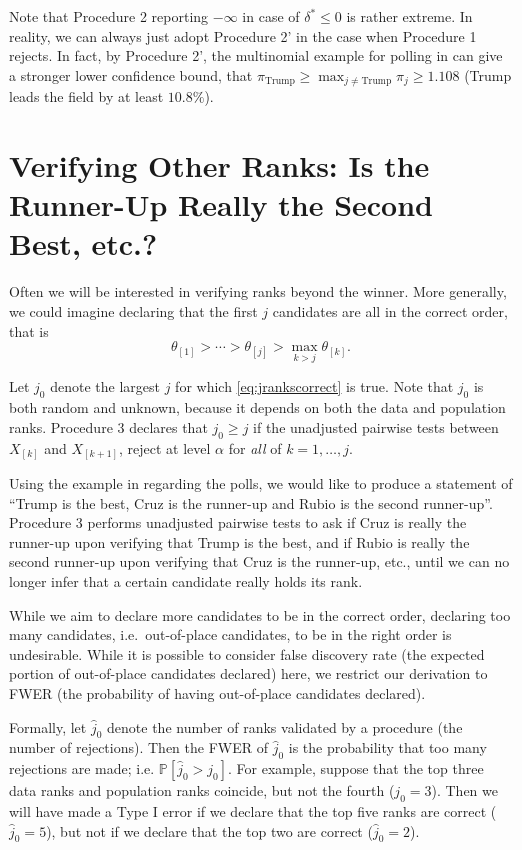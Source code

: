 \documentclass[11pt]{article}
\theoremstyle{definition}
\theoremstyle{custom}
\newcommand{\PP}{\mathbb{P}}
\begin{document}
Note that Procedure 2 reporting $-\infty$ in case of $\delta^* \le 0$ is rather extreme. In reality, we can always just adopt Procedure 2' in the case when Procedure 1 rejects. In fact, by Procedure 2', the multinomial example for polling in  can give a stronger lower confidence bound, that $\pi_{\text{Trump}} \ge \max_{j \ne \text{Trump}} \pi_{j} \ge 1.108$ (Trump leads the field by at least $10.8\%$).

\section{Verifying Other Ranks: Is the Runner-Up Really the Second Best, etc.?}
\label{sec:stepdown}

Often we will be interested in verifying ranks beyond the winner. More generally, we could imagine declaring that the first $j$ candidates are all in the correct order, that is
\begin{equation}
\theta_{[1]} > \cdots > \theta_{[j]} > \max_{k>j} \theta_{[k]}.
\label{eq:jrankscorrect}
\end{equation}

Let $j_0$ denote the largest $j$ for which \eqref{eq:jrankscorrect} is true. Note that $j_0$ is both random and unknown, because it depends on both the data and population ranks. Procedure 3 declares that $j_0 \ge j$ if the unadjusted pairwise tests between $X_{[k]}$ and $X_{[k+1]}$, reject at level $\alpha$ for {\em all} of $k = 1, \ldots, j$.

Using the example in  regarding the polls, we would like to produce a statement of ``Trump is the best, Cruz is the runner-up and Rubio is the second runner-up''. Procedure 3 performs unadjusted pairwise tests to ask if Cruz is really the runner-up upon verifying that Trump is the best, and if Rubio is really the second runner-up upon verifying that Cruz is the runner-up, etc., until we can no longer infer that a certain candidate really holds its rank.

While we aim to declare more candidates to be in the correct order, declaring too many candidates, i.e.\ out-of-place candidates, to be in the right order is undesirable. While it is possible to consider false discovery rate (the expected portion of out-of-place candidates declared) here, we restrict our derivation to FWER (the probability of having out-of-place candidates declared).

Formally, let $\hat{j}_0$ denote the number of ranks validated by a procedure (the number of rejections). Then the FWER of $\hat{j}_0$ is the probability that too many rejections are made; i.e. $\PP\left[\hat{j}_0 > j_0\right]$. For example, suppose that the top three data ranks and population ranks coincide, but not the fourth ($j_0 = 3$). Then we will have made a Type I error if we declare that the top five ranks are correct ($\hat{j}_0 = 5$), but not if we declare that the top two are correct ($\hat{j}_0 = 2$).
\end{document}
